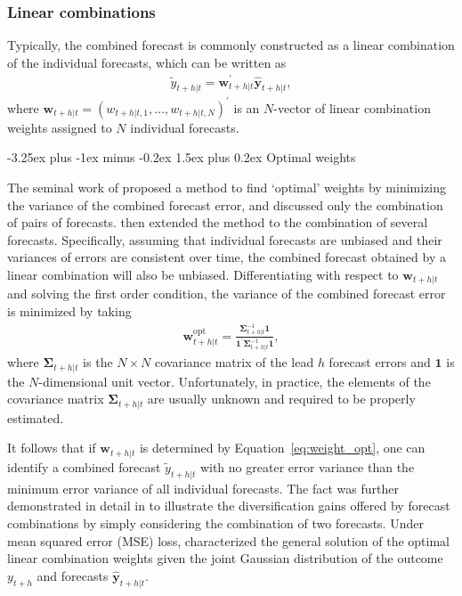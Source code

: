 \documentclass[11pt]{article}
\makeatletter
\renewcommand{\paragraph}{\@startsection{paragraph}{4}{0ex}%
   {-3.25ex plus -1ex minus -0.2ex}%
   {1.5ex plus 0.2ex}%
   {\normalfont\normalsize\bfseries}}
\makeatother
\begin{document}
\subsubsection{Linear combinations}
\label{sec:linear_combinations}

Typically, the combined forecast is commonly constructed as a linear combination of the individual forecasts, which can be written as
\begin{align}
\label{eq:linear-combinations}
\tilde{y}_{t+h|t}=\boldsymbol{w}_{t+h|t}^{\prime} \hat{\mathbf{y}}_{t+h|t},
\end{align}
where $\boldsymbol{w}_{t+h|t}=\left(w_{t+h|t, 1}, \ldots, w_{t+h|t, N}\right)^{\prime}$ is an $N$-vector of linear combination weights assigned to $N$ individual forecasts.

\paragraph{Optimal weights}

The seminal work of \cite{Bates1969-yj} proposed a method to find `optimal' weights by minimizing the variance of the combined forecast error, and discussed only the combination of pairs of forecasts. \cite{Newbold1974-lp} then extended the method to the combination of several forecasts. Specifically, assuming that individual forecasts are unbiased and their variances of errors are consistent over time, the combined forecast obtained by a linear combination will also be unbiased. Differentiating with respect to $\boldsymbol{w}_{t+h|t}$ and solving the first order condition, the variance of the combined forecast error is minimized by taking
\begin{align}
\label{eq:weight_opt}
\boldsymbol{w}_{t+h|t}^{\text{opt}}=\frac{\boldsymbol{\Sigma}_{t+h|t}^{-1}\mathbf{1}}{\mathbf{1}^{\prime} \boldsymbol{\Sigma}_{t+h|t}^{-1} \mathbf{1}},
\end{align}
where $\boldsymbol{\Sigma}_{t+h|t}$ is the $N \times N$ covariance matrix of the lead $h$ forecast errors and $\mathbf{1}$ is the $N$-dimensional unit vector. Unfortunately, in practice, the elements of the covariance matrix $\boldsymbol{\Sigma}_{t+h|t}$ are usually unknown and required to be properly estimated.

It follows that if $\boldsymbol{w}_{t+h|t}$ is determined by Equation~\eqref{eq:weight_opt}, one can identify a combined forecast $\tilde{y}_{t+h|t}$ with no greater error variance than the minimum error variance of all individual forecasts. The fact was further demonstrated in detail in \cite{Timmermann2006-en} to illustrate the diversification gains offered by forecast combinations by simply considering the combination of two forecasts. Under mean squared error (MSE) loss, \cite{Timmermann2006-en} characterized the general solution of the optimal linear combination weights given the joint Gaussian distribution of the outcome $y_{t+h}$ and forecasts $\hat{\mathbf{y}}_{t+h|t}$.
\end{document}
